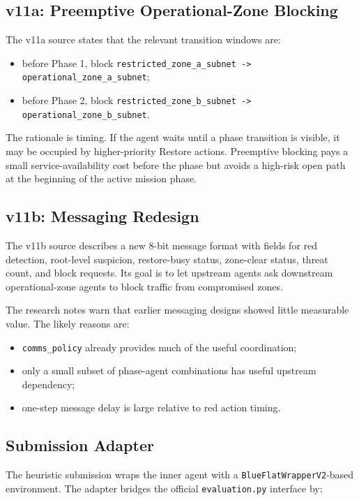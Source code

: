\subsection{v11a: Preemptive Operational-Zone Blocking}

The v11a source states that the relevant transition windows are:

\begin{itemize}
  \item before Phase 1, block \texttt{restricted\_zone\_a\_subnet -> operational\_zone\_a\_subnet};
  \item before Phase 2, block \texttt{restricted\_zone\_b\_subnet -> operational\_zone\_b\_subnet}.
\end{itemize}

The rationale is timing. If the agent waits until a phase transition is visible, it may be occupied by higher-priority Restore actions. Preemptive blocking pays a small service-availability cost before the phase but avoids a high-risk open path at the beginning of the active mission phase.

\subsection{v11b: Messaging Redesign}

The v11b source describes a new 8-bit message format with fields for red detection, root-level suspicion, restore-busy status, zone-clear status, threat count, and block requests. Its goal is to let upstream agents ask downstream operational-zone agents to block traffic from compromised zones.

The research notes warn that earlier messaging designs showed little measurable value. The likely reasons are:
\begin{itemize}
  \item \texttt{comms\_policy} already provides much of the useful coordination;
  \item only a small subset of phase-agent combinations has useful upstream dependency;
  \item one-step message delay is large relative to red action timing.
\end{itemize}

\subsection{Submission Adapter}

The heuristic submission wraps the inner agent with a \texttt{BlueFlatWrapperV2}-based environment. The adapter bridges the official \texttt{evaluation.py} interface by:

